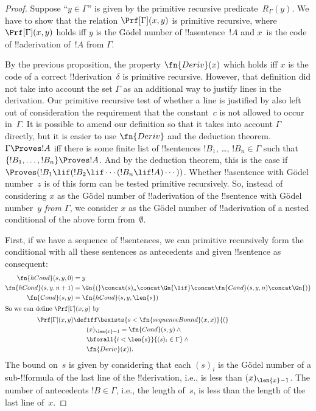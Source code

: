 \documentclass[../../../include/open-logic-section]{subfiles}
\begin{document}
\begin{proof}
Suppose ``$y \in \Gamma$'' is given by the primitive recursive
predicate~$R_\Gamma(y)$.  We have to show that the relation
$\Prf[\Gamma](x, y)$ is primitive recursive, where $\Prf[\Gamma](x,
y)$ holds iff $y$ is the G\"odel number of !!a{sentence}~$!A$ and
$x$~is the code of !!a{derivation} of~$!A$ from $\Gamma$.

By the previous proposition, the property $\fn{Deriv}(x)$ which holds
iff $x$ is the code of a correct !!{derivation}~$\delta$ is primitive
recursive. However, that definition did not take into account the set
$\Gamma$ as an additional way to justify lines in the derivation. Our
primitive recursive test of whether a line is justified by \QR{} also
left out of consideration the requirement that the constant~$c$ is not
allowed to occur in~$\Gamma$. It is possible to amend our definition so
that it takes into account $\Gamma$ directly, but it is easier to use
$\fn{Deriv}$ and the deduction theorem. $\Gamma \Proves !A$ iff
there is some finite list of !!{sentence}s $!B_1$, \dots, $!B_n \in
\Gamma$ such that $\{!B_1, \dots, !B_n\} \Proves !A$. And by the
deduction theorem, this is the case if $\Proves (!B_1 \lif (!B_2 \lif
\cdots (!B_n \lif !A)\cdots))$. Whether !!a{sentence} with G\"odel
number~$z$ is of this form can be tested primitive recursively.  So,
instead of considering $x$ as the G\"odel number of !!a{derivation} of
the !!{sentence} with G\"odel number~$y$ \emph{from $\Gamma$}, we consider
$x$ as the G\"odel number of !!a{derivation} of a nested conditional
of the above form from~$\emptyset$.

First, if we have a sequence of !!{sentence}s, we can primitive
recursively form the conditional with all these sentences as
antecedents and given !!{sentence} as consequent:
\begin{align*}
  \fn{hCond}(s, y, 0) & = y \\
  \fn{hCond}(s, y, n+1) & = \Gn{(} \concat (s)_{n} \concat \Gn{\lif}
  \concat \fn{Cond}(s, y, n) \concat \Gn{)}\\
  \fn{Cond}(s, y) & = \fn{hCond}(s, y, \len{s})\\
  \intertext{So we can define $\Prf[\Gamma](x, y)$ by}
  \Prf[\Gamma](x, y) & \defiff \bexists{s < \fn{sequenceBound}(x,x)}{(} \\
  &\qquad (x)_{\len{x}-1} = \fn{Cond}(s,y) \land {} \\
  &\qquad\bforall{i<\len{s}}{(s)_i \in \Gamma} \land {} \\
  &\qquad\fn{Deriv}(x)).
\end{align*}
The bound on~$s$ is given by considering that each $(s)_i$ is the
G\"odel number of a sub-!!{formula} of the last line of the !!{derivation},
i.e., is less than $(x)_{\len{x}-1}$. The number of antecedents $!B
\in \Gamma$, i.e., the length of~$s$, is less than the length of the
last line of~$x$.
\end{proof}
\end{document}
